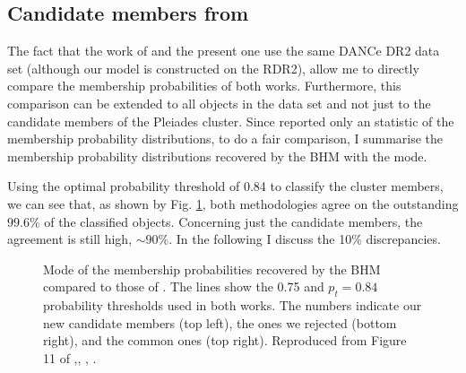 \subsection{Candidate members from \citet{Bouy2015}}
\label{sect:comparisonBouy}

The fact that the work of \citet{Bouy2015} and the present one use the same DANCe DR2 data set (although our model is constructed on the RDR2), allow me to directly compare the membership probabilities of both works. Furthermore, this comparison can be extended to all objects in the data set and not just to the candidate members of the Pleiades cluster. Since \citet{Bouy2015} reported only an statistic of the membership probability distributions, to do a fair comparison, I summarise the membership probability distributions recovered by the BHM with the mode.

Using the optimal probability threshold of 0.84 to classify the cluster members, we can see that, as shown by Fig. \ref{fig:BHMBouy}, both methodologies agree on the outstanding $99.6$\% of the classified objects. Concerning just the candidate members, the agreement is still high, $\sim 90\%$. In the following I discuss the 10\% discrepancies.

\begin{figure}[ht!]
\begin{center}
\caption{Mode of the membership probabilities recovered by the BHM compared to those of \citet{Bouy2015}. The lines show the 0.75 and $p_t=0.84$ probability thresholds used in both works. The numbers indicate our new candidate members (top left), the ones we rejected (bottom right), and the common ones (top right). Reproduced from Figure 11 of \citet{Olivares2017},\textit{}, , .}
\label{fig:BHMBouy}
\end{center}
\end{figure}

